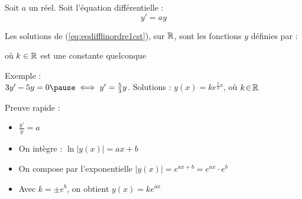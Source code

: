 \begin{frame}
\begin{theoreme}
\label{th:eqdifflinordre1cst}
Soit $a$ un réel. Soit l'équation différentielle :
\vspace*{-2ex}\begin{equation}
   y' = a y   
  \label{eq:eqdifflinordre1cst}
  \tag{$E$}
\end{equation}
\vspace*{-4ex}

Les solutions de (\ref{eq:eqdifflinordre1cst}), sur $\mathbb{R}$, sont les fonctions $y$ définies par :

\pause
\vspace*{-1ex}
\vspace*{-2ex}

\pause
où $k\in \mathbb{R}$ est une constante quelconque
\end{theoreme}
\pause
Exemple : \\
\qquad $3y' - 5y = 0 \pause \iff y' = \frac53 y$. \pause Solutions : $y(x) = k e^{\frac53x}$, où $k \!\in\! \mathbb{R}$

\medskip

\pause
Preuve rapide  : 
\pause
\begin{itemize}[<+->]
  \item $\frac{y'}{y} =  a$
  \item On intègre : $\ln |y(x)| = ax+b$
  \item On compose par l'exponentielle $|y(x)| = e^{ax+b} = e^{ax}\cdot e^b$
  \item Avec $k = \pm e^b$, on obtient $y(x) = k e^{ax}$
\end{itemize}

\end{frame}


\begin{frame}

~

{
\begin{minipage}{0.73\textwidth}
\end{minipage}
}

\vspace*{-3ex}

  \end{frame}








